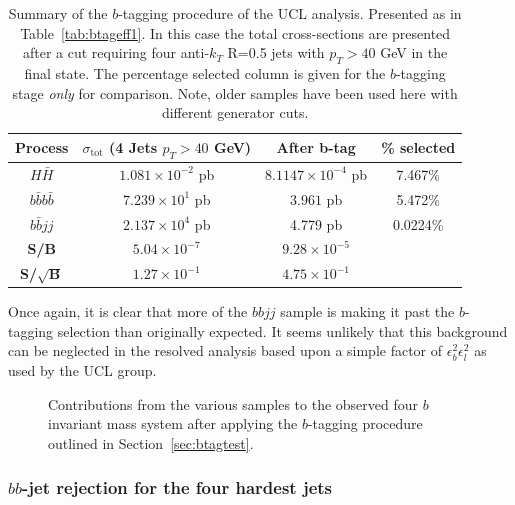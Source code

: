 \documentclass[12pt]{article}
\begin{document}
\begin{table}[h]
\begin{center}
\begin{tabular}{|c|c|c|c|}
\hline
Process & $\sigma_{\mathrm{tot}}$ (4 Jets $p_T>40$ GeV) & After b-tag & \% selected  \\
\hline \hline
$H\bar{H}$ & $1.081 \times 10^{-2}$ pb & $8.1147\times 10^{-4}$ pb & 7.467\% \\
\hline
$b\bar{b}b\bar{b}$ & $7.239 \times10^1$ pb & $3.961$ pb & 5.472\% \\
$b\bar{b}jj$ &  $2.137 \times 10^4$ pb & 4.779 pb & 0.0224\% \\
\hline
\textbf{S/B} & $5.04 \times 10^{-7}$ & $9.28 \times 10^{-5}$& \multicolumn{1}{c}{}\\
\cline{1-3}
\textbf{S/$\sqrt{\mathrm{\textbf{B}}}$}& $1.27 \times 10^{-1}$ & $4.75 \times 10^{-1}$& \multicolumn{1}{c}{}\\
\cline{1-3}
\end{tabular}
\end{center}
\caption{Summary of the $b$-tagging procedure of the UCL analysis. Presented as in Table~\ref{tab:btageff1}. In this case the total cross-sections are presented after a cut requiring four anti-$k_T$ R=0.5 jets with $p_T>40$ GeV in the final state. The percentage selected column is given for the $b$-tagging stage \emph{only} for comparison. Note, older samples have been used here with different generator cuts.}\label{tab:UCLbtag}
\end{table}%

Once again, it is clear that more of the $bbjj$ sample is making it past the $b$-tagging selection than originally expected. It seems unlikely that this background can be neglected in the resolved analysis based upon a simple factor of $\epsilon_b^{2}\epsilon_l^{2}$ as used by the UCL group.

\begin{figure}[h!]
\begin{center}
\caption{Contributions from the various samples to the observed four $b$ invariant mass system after applying the $b$-tagging procedure outlined in Section~\ref{sec:btagtest}.}
\end{center}
\end{figure}



\subsubsection{$bb$-jet rejection for the four hardest jets}
\end{document}
